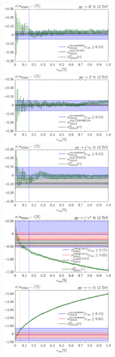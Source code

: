 \documentclass[english,11pt]{article}
\begin{document}
\begin{figure}
\begin{center}
\includegraphics[width=0.50\textwidth]{plots/rcut_plots/rcut_NNLO_pph21.pdf}\hfill
\includegraphics[width=0.50\textwidth]{plots/rcut_plots/rcut_NNLO_ppz01.pdf}\\
\includegraphics[width=0.50\textwidth]{plots/rcut_plots/rcut_NNLO_ppexne02nockm_FEWZ.pdf}\hfill
\includegraphics[width=0.50\textwidth]{plots/rcut_plots/rcut_NNLO_ppeex02_FEWZ.pdf}\\
\includegraphics[width=0.50\textwidth]{plots/rcut_plots/rcut_NNLO_ppaa02.pdf}\hfill

\end{center}
\end{figure}
\end{document}
